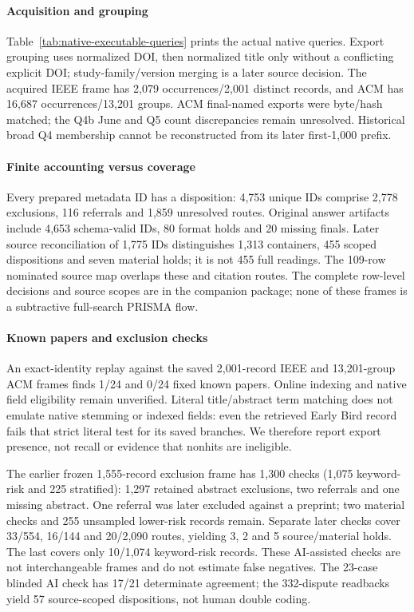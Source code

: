 

\paragraph{Acquisition and grouping}
Table~\ref{tab:native-executable-queries} prints the actual native queries. Export grouping uses normalized DOI, then normalized title only without a conflicting explicit DOI; study-family/version merging is a later source decision. The acquired IEEE frame has 2,079 occurrences/2,001 distinct records, and ACM has 16,687 occurrences/13,201 groups. ACM final-named exports were byte/hash matched; the Q4b June and Q5 count discrepancies remain unresolved. Historical broad Q4 membership cannot be reconstructed from its later first-1,000 prefix.

\paragraph{Finite accounting versus coverage}
Every prepared metadata ID has a disposition: 4,753 unique IDs comprise 2,778 exclusions, 116 referrals and 1,859 unresolved routes. Original answer artifacts include 4,653 schema-valid IDs, 80 format holds and 20 missing finals. Later source reconciliation of 1,775 IDs distinguishes 1,313 containers, 455 scoped dispositions and seven material holds; it is not 455 full readings. The 109-row nominated source map overlaps these and citation routes. The complete row-level decisions and source scopes are in the companion package; none of these frames is a subtractive full-search PRISMA flow.

\paragraph{Known papers and exclusion checks}
An exact-identity replay against the saved 2,001-record IEEE and 13,201-group ACM frames finds 1/24 and 0/24 fixed known papers. Online indexing and native field eligibility remain unverified. Literal title/abstract term matching does not emulate native stemming or indexed fields: even the retrieved Early Bird record fails that strict literal test for its saved branches. We therefore report export presence, not recall or evidence that nonhits are ineligible.

The earlier frozen 1,555-record exclusion frame has 1,300 checks (1,075 keyword-risk and 225 stratified): 1,297 retained abstract exclusions, two referrals and one missing abstract. One referral was later excluded against a preprint; two material checks and 255 unsampled lower-risk records remain. Separate later checks cover 33/554, 16/144 and 20/2,090 routes, yielding 3, 2 and 5 source/material holds. The last covers only 10/1,074 keyword-risk records. These AI-assisted checks are not interchangeable frames and do not estimate false negatives. The 23-case blinded AI check has 17/21 determinate agreement; the 332-dispute readbacks yield 57 source-scoped dispositions, not human double coding.

